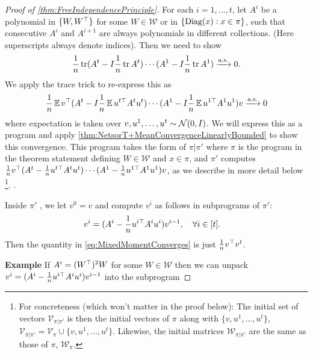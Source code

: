 \documentclass[main.tex]{subfiles}
\begin{document}
\begin{proof}[Proof of \cref{thm:FreeIndependencePrinciple}]

For each $i=1,\ldots,t$, let $A^{i}$ be a polynomial in $\{W,W^{\top}\}$ for some $W\in\mathcal{W}$ or in $\{\mathrm{Diag}(x):x\in\pi\}$, such that consecutive $A^{i}$ and $A^{i+1}$ are always polynomials in different collections. (Here superscripts always denote indices).
Then we need to show
\[
\frac{1}{n}\operatorname{tr}(A^{t}-I\frac{1}{n}\operatorname{tr} A^{t})\cdots(A^{1}-I\frac{1}{n}\operatorname{tr} A^{1})\xrightarrow{\mathrm{a.s.}}0.
\]
We apply the trace trick to re-express this as
\begin{equation}
\frac{1}{n}\EV v^{\trsp}(A^{t}-I\frac{1}{n}\EV u^{t\trsp}A^{t}u^{t})\cdots(A^{1}-I\frac{1}{n}\EV u^{1\trsp}A^{1}u^{1})v \asto 0
\label{eq:MixedMomentConverges}
\end{equation}
where expectation is taken over $v,u^{1},\ldots,u^{t}\sim\mathcal{N}(0,I)$.
We will express this as a \netsortplus{} program and apply \cref{thm:NetsorT+MeanConvergenceLinearlyBounded} to show this convergence.
This \netsortplus{} program takes the form of $\pi|\pi'$ where $\pi$ is the program in the theorem statement defining $W\in\mathcal{W}$ and $x\in\pi$, and $\pi'$ computes $\frac{1}{n}v^{\top}(A^{t}-\frac{1}{n}u^{t\top}A^{t}u^{t})\cdots(A^{1}-\frac{1}{n}u^{1\top}A^{1}u^{1})v$, as we describe in more detail below%
\footnote{For concreteness (which won't matter in the proof below): The initial set of vectors $\mathcal{V}_{\pi|\pi'}$ is then the initial vectors of $\pi$ along with $\{v,u^{1},\ldots,u^{t}\}$, $\mathcal{V}_{\pi|\pi'}=\mathcal{V}_{\pi}\cup\{v,u^{1},\ldots,u^{t}\}$.
Likewise, the initial matrices $\mathcal W_{\pi |\pi'}$ are the same as those of $\pi$, $\mathcal W_{\pi}$.}.
.

Inside $\pi'$ , we let $v^{0}=v$ and compute $v^{i}$ as follows in subprograms of $\pi'$:
\begin{align*}
v^{i} & =(A^{i}-\frac{1}{n}u^{i\top}A^{i}u^{i})v^{i-1},\quad\forall i\in[t].
\end{align*}
Then the quantity in \cref{eq:MixedMomentConverges} is just $\frac{1}{n}v^{\top}v^{t}$. %

\textbf{Example} If $A^{i}=(W^{\top})^{2}W$ for some $W\in\mathcal{W}$ then we can unpack $v^{i}=(A^{i}-\frac{1}{n}u^{i\top}A^{i}u^{i})v^{i-1}$ into the subprogram


\end{proof}
\end{document}
